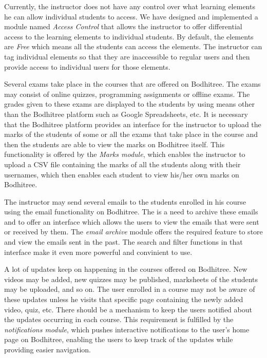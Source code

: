 \par Currently, the instructor does not have any control over what learning elements he can allow individual students to access. We have designed and implemented a module named \textit{Access Control} that allows the instructor to offer differential access to the learning elements to individual students. By default, the elements are \textit{Free} which means all the students can access the elements. The instructor can tag individual elements so that they are inaccessible to regular users and then provide access to individual users for those elements.

\par Several exams take place in the courses that are offered on Bodhitree. The exams may consist of online quizzes, programming assignments or offline exams. The grades given to these exams are displayed to the students by using means other than the Bodhitree platform such as Google Spreadsheets, etc. It is necessary that the Bodhitree platform provides an interface for the instructor to upload the marks of the students of some or all the exams that take place in the course and then the students are able to view the marks on Bodhitree itself. This functionality is offered by the \textit{Marks module}, which enables the instructor to upload a CSV file containing the marks of all the students along with their usernames, which then enables each student to view his/her own marks on Bodhitree.

\par The instructor may send several emails to the students enrolled in his course using the email functionality on Bodhitree. The is a need to archive these emails and to offer an interface which allows the users to view the emails that were sent or received by them. The \textit{email archive} module offers the required feature to store and view the emails sent in the past. The search and filter functions in that interface make it even more powerful and convinient to use.

\par A lot of updates keep on happening in the courses offered on Bodhitree. New videos may be added, new quizzes may be published, marksheets of the students may be uploaded, and so on. The user enrolled in a course may not be aware of these updates unless he visits that specific page containing the newly added video, quiz, etc. There should be a mechanism to keep the users notified about the updates occurring in each course. This requirement is fulfilled by the \textit{notifications module}, which pushes interactive notifications to the user's home page on Bodhitree, enabling the users to keep track of the updates while providing easier navigation.

